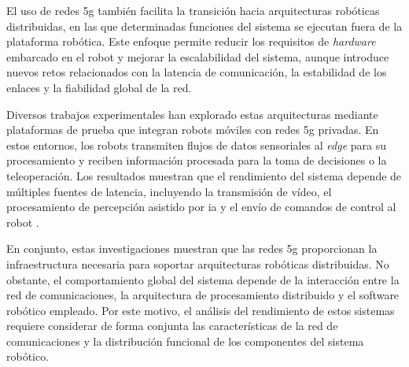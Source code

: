 El uso de redes \gls{5g} también facilita la transición hacia arquitecturas robóticas distribuidas, en las que determinadas funciones del sistema se ejecutan fuera de la plataforma robótica. Este enfoque permite reducir los requisitos de \textit{hardware} embarcado en el robot y mejorar la escalabilidad del sistema, aunque introduce nuevos retos relacionados con la latencia de comunicación, la estabilidad de los enlaces y la fiabilidad global de la red.

Diversos trabajos experimentales han explorado estas arquitecturas mediante plataformas de prueba que integran robots móviles con redes \gls{5g} privadas. En estos entornos, los robots transmiten flujos de datos sensoriales al \textit{edge} para su procesamiento y reciben información procesada para la toma de decisiones o la teleoperación. Los resultados muestran que el rendimiento del sistema depende de múltiples fuentes de latencia, incluyendo la transmisión de vídeo, el procesamiento de percepción asistido por \gls{ia} y el envío de comandos de control al robot \cite{Lozano2025DigitalTwin6G}.

En conjunto, estas investigaciones muestran que las redes \gls{5g} proporcionan la infraestructura necesaria para soportar arquitecturas robóticas distribuidas. No obstante, el comportamiento global del sistema depende de la interacción entre la red de comunicaciones, la arquitectura de procesamiento distribuido y el software robótico empleado. Por este motivo, el análisis del rendimiento de estos sistemas requiere considerar de forma conjunta las características de la red de comunicaciones y la distribución funcional de los componentes del sistema robótico.